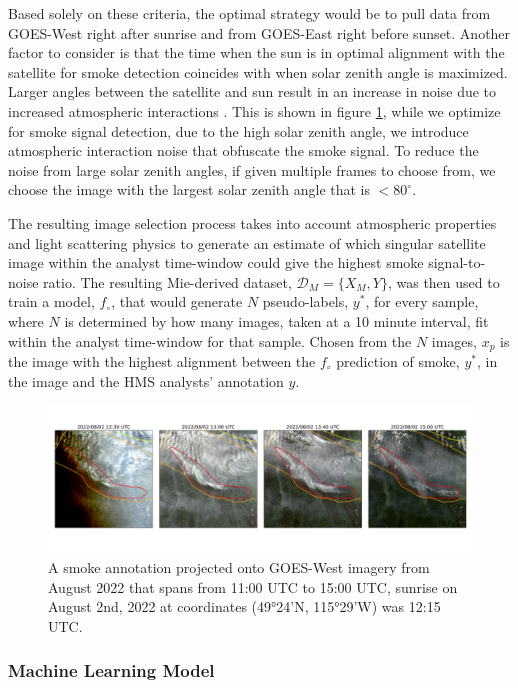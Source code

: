 \documentclass{article}
\begin{document}
Based solely on these criteria, the optimal strategy would be to pull data from GOES-West right after sunrise and from GOES-East right before sunset. Another factor to consider is that the time when the sun is in optimal alignment with the satellite for smoke detection coincides with when solar zenith angle is maximized. Larger angles between the satellite and sun result in an increase in noise due to increased atmospheric interactions \cite{zen_angle}. This is shown in figure \ref{G17_sunrise}, while we optimize for smoke signal detection, due to the high solar zenith angle, we introduce atmospheric interaction noise that obfuscate the smoke signal. To reduce the noise from large solar zenith angles, if given multiple frames to choose from, we choose the image with the largest solar zenith angle that is \(<80^{\circ}\).



The resulting image selection process takes into account atmospheric properties and light scattering physics to generate an estimate of which singular satellite image within the analyst time-window could give the highest smoke signal-to-noise ratio. The resulting Mie-derived dataset, \(\mathcal{D}_M = \{X_M, Y\}\), was then used to train a model, \(f_{\circ}\), that would generate \(N\) pseudo-labels, \(y^*\), for every sample, where \(N\) is determined by how many images, taken at a 10 minute interval, fit within the analyst time-window for that sample. Chosen from the \(N\) images, \(x_p\) is the image with the highest alignment between the \(f_{\circ}\) prediction of smoke, \(y^*\), in the image and the HMS analysts' annotation \(y\).

\begin{figure}
    \centering
    \includegraphics[width=12cm]{figures/timelapse_G17_2.png}
    \caption{A smoke annotation projected onto GOES-West imagery from August 2022 that spans from 11:00 UTC to 15:00 UTC, sunrise on August 2nd, 2022 at coordinates (49°24'N, 115°29'W) was 12:15 UTC.}\label{G17_sunrise}
\end{figure}

\subsubsection*{Machine Learning Model} 
\end{document}
